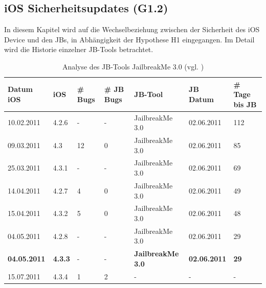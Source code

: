 \subsection{iOS Sicherheitsupdates  (G1.2)}
\label{sec:Frage2SecUpdate}

In diesem Kapitel wird auf die Wechselbeziehung zwischen der Sicherheit des iOS Device und den JBs, in Abhängigkeit der Hypothese H1 eingegangen. Im Detail wird die Historie einzelner JB-Tools betrachtet. 

\begin{table}[hp!]
    \begin{center}
        \begin{tabular}{| p{20mm} | p{12mm} | p{17mm} | p{12mm} | p{32mm} | p{22mm} | p{15mm} |} \hline
             \textbf{Datum iOS} & \textbf{iOS} & \textbf{\# Bugs} & \textbf{\# JB Bugs} & \textbf{JB-Tool} & \textbf{JB Datum} & \textbf{\# Tage bis JB} \\ \hline 
            10.02.2011 & 4.2.6 &  - & -  & JailbreakMe 3.0 & 02.06.2011 & 112 \\ \hline
             09.03.2011 & 4.3 & 12 & 0 & JailbreakMe 3.0 &	02.06.2011 & 85 \\ \hline
             25.03.2011 & 4.3.1 &  - & - & JailbreakMe 3.0 & 02.06.2011 & 69 \\ \hline
            14.04.2011 & 4.2.7 &  4 & 0 & JailbreakMe 3.0 & 02.06.2011 & 49 \\ \hline
             15.04.2011 & 4.3.2 & 5 & 0 & JailbreakMe 3.0 & 02.06.2011 & 48 \\ \hline
             04.05.2011 & 4.2.8 &  - & - & JailbreakMe 3.0 & 02.06.2011 & 29 \\ \hline
            \textbf{04.05.2011} & \textbf{4.3.3} &  - & -  & \textbf{JailbreakMe 3.0} & \textbf{02.06.2011} & \textbf{29} \\ \hline
            15.07.2011 & 4.3.4 &  1 & 2	 & - & - & - \\ \hline
        \end{tabular} 
        \caption{Analyse des JB-Tools JailbreakMe 3.0 (vgl. \cite{Apple[7]}) \protect\footnotemark }         
        \label{tab:AnalyseJailbreakMe3.0}
    \end{center}
\end{table}

